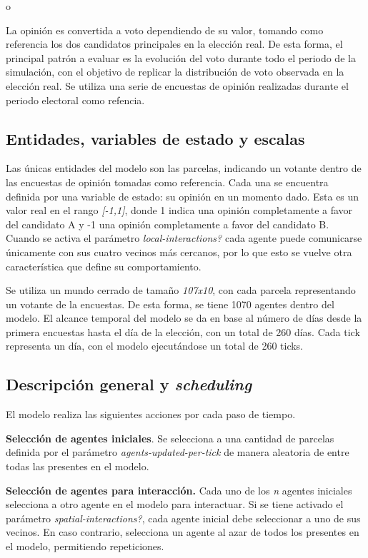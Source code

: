 o \documentclass[11pt, letterpaper]{article}
\begin{document}
La opinión es convertida a voto dependiendo de su valor, tomando como
referencia los dos candidatos principales en la elección real. De esta
forma, el principal patrón a evaluar es la evolución del voto durante
todo el periodo de la simulación, con el objetivo de replicar la
distribución de voto observada en la elección real. Se utiliza una serie
de encuestas de opinión realizadas durante el periodo electoral como
refencia.

\subsection{Entidades, variables de estado y
escalas}\label{entidades-variables-de-estado-y-escalas}

Las únicas entidades del modelo son las parcelas, indicando un votante
dentro de las encuestas de opinión tomadas como referencia. Cada una se
encuentra definida por una variable de estado: su opinión en un momento
dado. Esta es un valor real en el rango \emph{{[}-1,1{]}}, donde 1
indica una opinión completamente a favor del candidato A y -1 una
opinión completamente a favor del candidato B. Cuando se activa el
parámetro \emph{local-interactions?} cada agente puede comunicarse
únicamente con sus cuatro vecinos más cercanos, por lo que esto se
vuelve otra característica que define su comportamiento.

Se utiliza un mundo cerrado de tamaño \emph{107x10}, con cada parcela
representando un votante de la encuestas. De esta forma, se tiene 1070
agentes dentro del modelo. El alcance temporal del modelo se da en base
al número de días desde la primera encuestas hasta el día de la
elección, con un total de 260 días. Cada tick representa un día, con el
modelo ejecutándose un total de 260 ticks.

\subsection{Descripción general y
\emph{scheduling}}\label{descripciuxf3n-general-y-scheduling}

El modelo realiza las siguientes acciones por cada paso de tiempo.

\textbf{Selección de agentes iniciales}. Se selecciona a una cantidad de
parcelas definida por el parámetro \emph{agents-updated-per-tick} de
manera aleatoria de entre todas las presentes en el modelo.

\textbf{Selección de agentes para interacción.} Cada uno de los \emph{n}
agentes iniciales selecciona a otro agente en el modelo para
interactuar. Si se tiene activado el parámetro
\emph{spatial-interactions?}, cada agente inicial debe seleccionar a uno
de sus vecinos. En caso contrario, selecciona un agente al azar de todos
los presentes en el modelo, permitiendo repeticiones.
\end{document}
